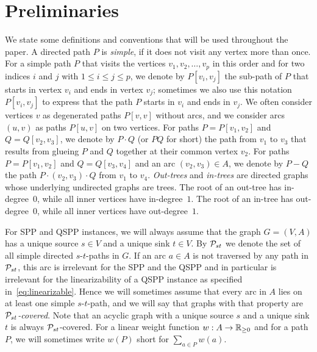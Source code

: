 \section{Preliminaries}
\label{sec:preliminearies}
We state some definitions and conventions that will be used throughout the paper.
A directed path $P$ is \emph{simple}, if it does not visit any vertex more than once.
For a simple path $P$ that visits the vertices $v_1,v_2,\ldots,v_p$ in this order and 
for two indices $i$ and $j$ with $1\le i\le j\le p$, we denote by $P[v_i,v_j]$ the 
sub-path of $P$ that starts in vertex $v_i$ and ends in vertex $v_j$;
sometimes we also use this notation $P[v_i,v_j]$ to express that the path $P$ starts 
in $v_i$ and ends in $v_j$.
We often consider vertices $v$ as degenerated paths $P[v,v]$ without arcs,
and we consider arcs $(u,v)$ as paths $P[u,v]$ on two vertices.
For paths $P=P[v_1,v_2]$ and $Q=Q[v_2,v_3]$, we denote by $P\cdot Q$ (or $PQ$ for short) the path 
from $v_1$ to $v_3$ that results from glueing $P$ and $Q$ together at their common vertex $v_2$.
For paths $P=P[v_1,v_2]$ and $Q=Q[v_3,v_4]$ and an arc $(v_2,v_3)\in A$, we denote by $P-Q$ 
the path $P\cdot(v_2,v_3)\cdot Q$ from $v_1$ to $v_4$.
\emph{Out-trees} and \emph{in-trees} are directed graphs whose underlying undirected graphs are trees.
The root of an out-tree has  in-degree~$0$, while all inner vertices have  in-degree~$1$.
The root of an  in-tree has out-degree~$0$, while all inner vertices have out-degree~$1$.

For SPP and QSPP instances, we will always assume that the graph $G=(V,A)$ has a unique source $s\in V$ 
and a unique sink $t\in V$. 
By ${\cal P}_{st}$ we denote the set of all simple directed $s$-$t$-paths in $G$.
If an arc $a\in A$ is not traversed by any path in ${\cal P}_{st}$, this arc is irrelevant for
the SPP and the QSPP and in particular is irrelevant for the linearizability of a QSPP 
instance as specified in~\eqref{eq:linearizable}.
Hence we will sometimes assume that every arc in $A$ lies on at least one simple $s$-$t$-path,
and we will say that graphs with that property are \emph{${\cal P}_{st}$-covered}.
Note that an acyclic graph with a unique source $s$ and a unique sink $t$ is always ${\cal P}_{st}$-covered.
For a linear weight function $w:A\to{\mathbb{R}_{\ge0}}$ and for a path $P$, we will sometimes write $w(P)$
short for $\sum_{a\in P}w(a)$.


\medskip
